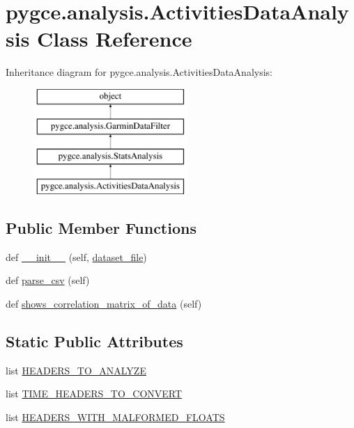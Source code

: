 \hypertarget{classpygce_1_1analysis_1_1_activities_data_analysis}{}\section{pygce.\+analysis.\+Activities\+Data\+Analysis Class Reference}
\label{classpygce_1_1analysis_1_1_activities_data_analysis}
Inheritance diagram for pygce.\+analysis.\+Activities\+Data\+Analysis\+:\begin{figure}[H]
\begin{center}
\leavevmode
\includegraphics[height=4.000000cm]{classpygce_1_1analysis_1_1_activities_data_analysis}
\end{center}
\end{figure}
\subsection*{Public Member Functions}
\begin{DoxyCompactItemize}
\item 
def \hyperlink{classpygce_1_1analysis_1_1_activities_data_analysis_a975523ebe1d0e6e29c690b999eca191b}{\+\_\+\+\_\+init\+\_\+\+\_\+} (self, \hyperlink{classpygce_1_1analysis_1_1_garmin_data_filter_a1d609bdd447d36bafce41e43586540ef}{dataset\+\_\+file})
\item 
def \hyperlink{classpygce_1_1analysis_1_1_activities_data_analysis_ae9eeead50f60011ca4745fba87532df4}{parse\+\_\+csv} (self)
\item 
def \hyperlink{classpygce_1_1analysis_1_1_activities_data_analysis_ad9c9a9dfebc3f269c9cb9067fad2365e}{shows\+\_\+correlation\+\_\+matrix\+\_\+of\+\_\+data} (self)
\end{DoxyCompactItemize}
\subsection*{Static Public Attributes}
\begin{DoxyCompactItemize}
\item 
list \hyperlink{classpygce_1_1analysis_1_1_activities_data_analysis_ab6e96136ec635b6faa18ebb24f1db35d}{H\+E\+A\+D\+E\+R\+S\+\_\+\+T\+O\+\_\+\+A\+N\+A\+L\+Y\+ZE}
\item 
list \hyperlink{classpygce_1_1analysis_1_1_activities_data_analysis_aad6be4b72fa047730b0c5e53f50f644d}{T\+I\+M\+E\+\_\+\+H\+E\+A\+D\+E\+R\+S\+\_\+\+T\+O\+\_\+\+C\+O\+N\+V\+E\+RT}
\item 
list \hyperlink{classpygce_1_1analysis_1_1_activities_data_analysis_a1f7ff038df4e658a32278a9385bded54}{H\+E\+A\+D\+E\+R\+S\+\_\+\+W\+I\+T\+H\+\_\+\+M\+A\+L\+F\+O\+R\+M\+E\+D\+\_\+\+F\+L\+O\+A\+TS}
\end{DoxyCompactItemize}
